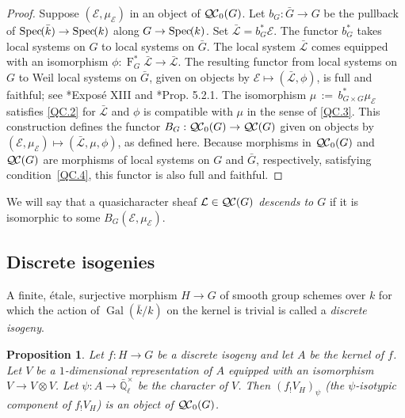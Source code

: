 \documentclass[10pt]{amsart}
\theoremstyle{plain}
\newtheorem{proposition}[theorem]{Proposition}
\theoremstyle{definition}
\theoremstyle{remark}
\newcommand{\EE}{\mathbb{\bar Q}_\ell}
\newcommand{\bFq}{\bar{k}}
\newcommand{\Fq}{k}
\newcommand{\EEx}{\EE^\times}
\DeclareMathOperator{\Gal}{Gal}
\newcommand{\Frob}[1]{\operatorname{F}_{#1}}
\newcommand{\Spec}[1]{{\operatorname{Spec}\hskip-1pt( #1 )}}
\newcommand{\ceq}{{\, :=\, }}
\newcommand{\qcs}[1]{{\mathcal{#1}}}
\newcommand{\gqcs}[1]{{\mathcal{\bar #1}}}
\newcommand{\QC}{{\mathcal{Q\hskip-0.8pt C}}}
\newcommand{\bQC}{{\QC_0}}
\newcommand{\bG}{\bar{G}}
\begin{document}
\begin{proof}
 Suppose $(\qcs{E},\mu_\qcs{E})$ in an object of $\bQC(G)$.
 Let $b_G : {\bar G} \to G$ be the pullback of $\Spec{\bFq} \to \Spec{\Fq}$ along $G\to \Spec{\Fq}$.
 Set $\gqcs{L} = b_G^* \qcs{E}$. 
 The functor $b_G^*$ takes local systems on $G$ to local systems on $\bG$.
 The local system $\gqcs{L}$ comes equipped with an isomorphism
 $\phi: \Frob{G}^* \gqcs{L} \to \gqcs{L}$.
 The resulting functor from local systems on $G$ to Weil local systems on $\bG$, given on objects by $\qcs{E} \mapsto (\gqcs{L},\phi)$, 
 is full and faithful; see \cite{deligne-katz:SGA7.2}*{Expos\'e XIII} and \cite{beilinson-bernstein-deligne:81a}*{Prop. 5.2.1}.
 The isomorphism $\mu \ceq b_{G\times G}^*\mu_\qcs{E}$ satisfies \ref{QC.2}
 for $\gqcs{L}$ and $\phi$ is compatible with $\mu$ in the sense of \ref{QC.3}.
 This construction defines the functor $B_G : \bQC(G) \to \QC(G)$ given on objects by $(\qcs{E},\mu_\qcs{E}) \mapsto (\gqcs{L},\mu, \phi)$, as defined here. 
 Because morphisms in $\bQC(G)$ and $\QC(G)$ are morphisms of local systems on $G$ and $\bG$, respectively, satisfying condition~\ref{QC.4}, this functor is also full and faithful.
\end{proof}

We will say that a quasicharacter sheaf $\qcs{L} \in \QC(G)$ \emph{descends to $G$} if it is isomorphic to some $B_G(\qcs{E}, \mu_\qcs{E})$.

\subsection{Discrete isogenies}\label{ssec:discrete_isogenies}

A finite, \'etale, surjective morphism $H\to G$ of smooth group schemes over $\Fq$ for which the action of $\Gal(\bFq/\Fq)$ on the kernel is trivial is called a {\it discrete isogeny}.

\begin{proposition}\label{prop:finite}
Let $f: H \to G$ be a discrete isogeny and let $A$ be the kernel of $f$.
Let $V$ be a $1$-dimensional representation of $A$ 
equipped with an isomorphism $V\to V\otimes V$.
Let $\psi : A \to \EEx$ be the character of $V$.
Then $(f_! V_H)_\psi$ (the $\psi$-isotypic component of $f_!V_H$) is an object of $\bQC(G)$.
\end{proposition}
\end{document}
